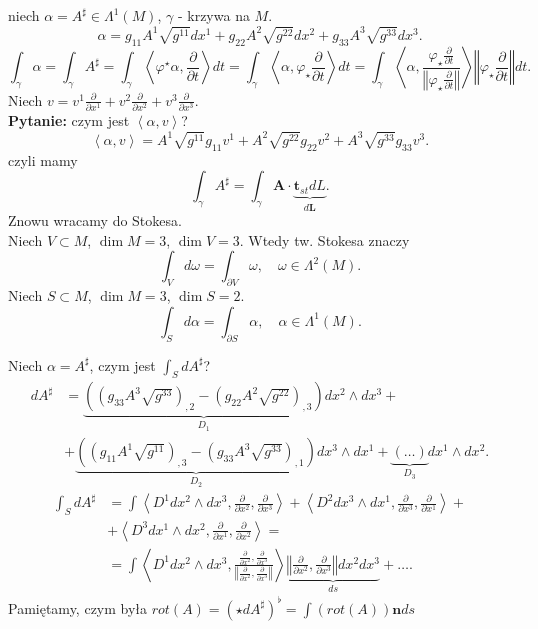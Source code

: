 \documentclass[../main.tex]{subfiles}
\begin{document}
niech $ \alpha = A^\sharp\in\Lambda^1(M)$, $\gamma$ - krzywa na $M$.
\[
\alpha = g_{11}A^1\sqrt{g^{11}} dx^{1} + g_{22}A^{2}\sqrt{g^{22}} dx^{2} + g_{33}A^{3}\sqrt{g^{33}} dx^{3}
.\]
\[
    \int_\gamma \alpha = \int_\gamma A^\sharp = \int_\gamma \left<\varphi^\star\alpha, \frac{\partial }{\partial t}  \right>dt = \int_\gamma \left<\alpha, \varphi_\star \frac{\partial }{\partial t}  \right>dt = \int_\gamma\left<\alpha, \frac{\varphi_\star \frac{\partial }{\partial t} }{\left\Vert \varphi_\star \frac{\partial }{\partial t}  \right\Vert } \right> \left\Vert \varphi_\star \frac{\partial }{\partial t}  \right\Vert dt
.\]
Niech $v = v^1 \frac{\partial }{\partial x^1} + v^2 \frac{\partial }{\partial x^2} + v^3 \frac{\partial }{\partial x^3} $.\\
\textbf{Pytanie:} czym jest $\left<\alpha, v \right>$?\\
\[
\left<\alpha, v \right> = A^1\sqrt{g^{11}}g_{11} v^1 + A^2 \sqrt{g^{22}}g_{22} v^2 + A^3\sqrt{g^{33}} g_{33}v^3
.\]
czyli mamy
\[
    \int_\gamma A^\sharp = \int_\gamma \mathbf{A}\cdot \underbrace{\mathbf{t}_{st} dL}_{d\mathbf{L}}
.\]
Znowu wracamy do Stokesa.\\
Niech $V\subset M$, $\dim M = 3$, $\dim V = 3$. Wtedy tw. Stokesa znaczy
\[
    \int_Vd\omega = \int_{\partial V}\omega,\quad \omega \in \Lambda^2(M)
.\]
Niech $S\subset M$, $\dim M = 3$, $\dim S = 2$.
\[
    \int_Sd\alpha = \int_{\partial S}\alpha,\quad \alpha\in \Lambda^1(M)
.\]
\begin{pytanie}
    Niech $\alpha = A^\sharp$, czym jest $\int_SdA^\sharp$?\\
    \begin{align*}
        dA^\sharp &= \underbrace{\left(\left( g_{33}A^3\sqrt{g^{33}}  \right) _{,2} -\left( g_{22}A^2\sqrt{g^{22}}  \right)_{,3}  \right)}_{D_1} dx^2\land dx^3 +\\
        &+\underbrace{\left( \left( g_{11}A^1\sqrt{g^{11}}  \right) _{,3} - \left( g_{33}A^3\sqrt{g^{33}}  \right) _{,1} \right)}_{D_2} dx^3\land dx^1 + \underbrace{\left( \ldots \right)}_{D_3} dx^1\land dx^2
    .\end{align*}
\begin{align*}
    \int_S dA^\sharp &= \int \left<D^1dx^2\land dx^3, \frac{\partial }{\partial x^2} , \frac{\partial }{\partial x^3}  \right> + \left<D^2dx^3\land dx^1, \frac{\partial }{\partial x^3} , \frac{\partial }{\partial x^1}  \right> +\\
    &+ \left<D^3dx^1\land dx^2, \frac{\partial }{\partial x^1} , \frac{\partial }{\partial x^2}  \right> =\\
    &= \int\left<D^1dx^2\land dx^3, \frac{\frac{\partial }{\partial x^2} , \frac{\partial }{\partial x^3} }{\left\Vert \frac{\partial }{\partial x^2}, \frac{\partial }{\partial x^3}  \right\Vert } \right> \underbrace{\left\Vert \frac{\partial }{\partial x^2} , \frac{\partial }{\partial x^3}  \right\Vert dx^2dx^3}_{ds} + \ldots
.\end{align*}
Pamiętamy, czym była $rot(A) = \left( \star dA^\sharp \right) ^\flat = \int\left( rot(A) \right) \mathbf{n}ds$
\end{pytanie}
\end{document}
